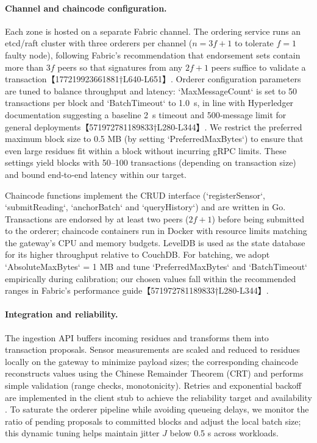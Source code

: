 \paragraph{Channel and chaincode configuration.}
Each zone is hosted on a separate Fabric channel.  The ordering service runs an etcd/raft cluster with three orderers per channel (\(n=3f+1\) to tolerate \(f=1\) faulty node), following Fabric’s recommendation that endorsement sets contain more than \(3f\) peers so that signatures from any \(2f+1\) peers suffice to validate a transaction【177219923661881†L640-L651】.  Orderer configuration parameters are tuned to balance throughput and latency: `MaxMessageCount` is set to 50 transactions per block and `BatchTimeout` to 1.0~s, in line with Hyperledger documentation suggesting a baseline 2~s timeout and 500‑message limit for general deployments【571972781189833†L280-L344】.  We restrict the preferred maximum block size to 0.5 MB (by setting `PreferredMaxBytes`) to ensure that even large residues fit within a block without incurring gRPC limits.  These settings yield blocks with 50–100 transactions (depending on transaction size) and bound end‑to‑end latency within our \SLOpL{} target.

Chaincode functions implement the CRUD interface (`registerSensor`, `submitReading`, `anchorBatch` and `queryHistory`) and are written in Go.  Transactions are endorsed by at least two peers (\(2f+1\)) before being submitted to the orderer; chaincode containers run in Docker with resource limits matching the gateway’s CPU and memory budgets.  LevelDB is used as the state database for its higher throughput relative to CouchDB.  For batching, we adopt `AbsoluteMaxBytes` = 1 MB and tune `PreferredMaxBytes` and `BatchTimeout` empirically during calibration; our chosen values fall within the recommended ranges in Fabric’s performance guide【571972781189833†L280-L344】.

\paragraph{Integration and reliability.}
The ingestion API buffers incoming residues and transforms them into transaction proposals.  Sensor measurements are scaled and reduced to residues locally on the gateway to minimize payload sizes; the corresponding chaincode reconstructs values using the Chinese Remainder Theorem (CRT) and performs simple validation (range checks, monotonicity).  Retries and exponential backoff are implemented in the client stub to achieve the reliability target \SLOR{} and availability \SLOA{}.  To saturate the orderer pipeline while avoiding queueing delays, we monitor the ratio of pending proposals to committed blocks and adjust the local batch size; this dynamic tuning helps maintain jitter \(J\) below 0.5 s across workloads.

